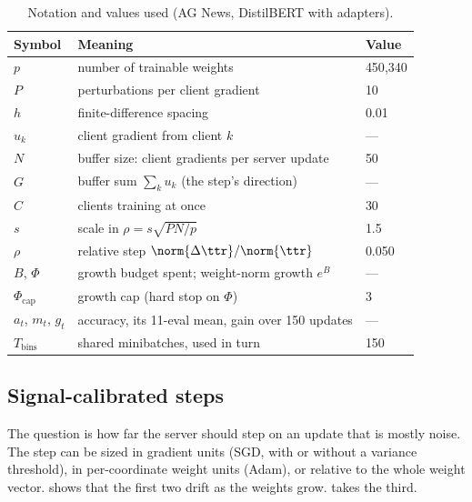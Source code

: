 \begin{table}[t]
\centering
\caption{Notation and values used (AG News, DistilBERT with adapters).}
\label{tab:ft:notation}
\small
\begin{tabular}{@{}lll@{}}
\toprule
Symbol & Meaning & Value \\
\midrule
$p$ & number of trainable weights & 450{,}340 \\
$P$ & perturbations per client gradient & 10 \\
$h$ & finite-difference spacing & 0.01 \\
$u_k$ & client gradient from client $k$ & --- \\
$N$ & buffer size: client gradients per server update & 50 \\
$G$ & buffer sum $\sum_k u_k$ (the step's direction) & --- \\
$C$ & clients training at once & 30 \\
$s$ & scale in $\rho=s\sqrt{PN/p}$ & 1.5 \\
$\rho$ & relative step $\norm{\Delta\ttr}/\norm{\ttr}$ & 0.050 \\
$B$, $\Phi$ & growth budget spent; weight-norm growth $e^B$ & --- \\
$\Phi_{\mathrm{cap}}$ & growth cap (hard stop on $\Phi$) & 3 \\
$a_t$, $m_t$, $g_t$ & accuracy, its 11-eval mean, gain over 150 updates & --- \\
$T_{\mathrm{bins}}$ & shared minibatches, used in turn & 150 \\
\bottomrule
\end{tabular}
\end{table}


\subsection{Signal-calibrated steps}
\label{sec:ft:step}
\label{sec:ft:pool}

The question is how far the server should step on an update that is
mostly noise.  The step can be sized in gradient units (SGD, with or without a
variance threshold), in per-coordinate weight units (Adam), or relative to the
whole weight vector.  shows that the first two drift as
the weights grow. \sys takes the third.

